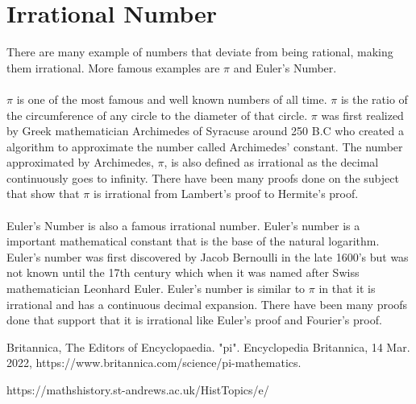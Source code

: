 \documentclass{article}
\begin{document}
\section{Irrational Number}
There are many example of numbers that deviate from being rational, making them irrational.
More famous examples are $\pi$ and Euler's Number. 
\\\\$\pi$ is one of the most famous and well known numbers of all time. $\pi$ is the ratio of 
the circumference of any circle to the diameter of that circle. $\pi$ was first realized by
Greek mathematician Archimedes of Syracuse around 250 B.C who created a algorithm to approximate
the number called Archimedes' constant. The number approximated by Archimedes, $\pi$, is also defined as
irrational as the decimal continuously goes to infinity. There have been many proofs done on the subject
that show that $\pi$ is irrational from Lambert's proof to Hermite's proof.
\\\\Euler's Number is also a famous irrational number. Euler's number is a important mathematical constant
that is the base of the natural logarithm. Euler's number was first discovered by Jacob Bernoulli in the late 1600's
but was not known until the 17th century which when it was named after Swiss mathematician Leonhard Euler.
Euler's number is similar to $\pi$ in that it is irrational and has a continuous decimal expansion. There have been many proofs
done that support that it is irrational like Euler's proof and Fourier's proof.

\begin{thebibliography}{9}
    Britannica, The Editors of Encyclopaedia. "pi". Encyclopedia Britannica, 14 Mar. 2022, https://www.britannica.com/science/pi-mathematics. 
    
    https://mathshistory.st-andrews.ac.uk/HistTopics/e/
\end{thebibliography}
\end{document}
